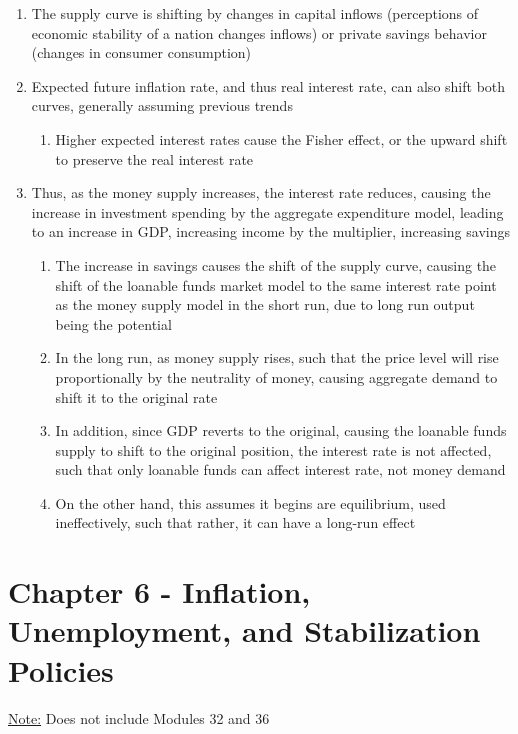 \documentclass[11 pt, twoside]{article}
\begin{document}
\begin{enumerate}
\item The supply curve is shifting by changes in capital inflows (perceptions of economic stability of a nation changes inflows) or private savings behavior (changes in consumer consumption)
\item Expected future inflation rate, and thus real interest rate, can also shift both curves, generally assuming previous trends
\begin{enumerate}
\item Higher expected interest rates cause the Fisher effect, or the upward shift to preserve the real interest rate
\end{enumerate}
\item Thus, as the money supply increases, the interest rate reduces, causing the increase in investment spending by the aggregate expenditure model, leading to an increase in GDP, increasing income by the multiplier, increasing savings
\begin{enumerate}
\item The increase in savings causes the shift of the supply curve, causing the shift of the loanable funds market model to the same interest rate point as the money supply model in the short run, due to long run output being the potential
\item In the long run, as money supply rises, such that the price level will rise proportionally by the neutrality of money, causing aggregate demand to shift it to the original rate
\item In addition, since GDP reverts to the original, causing the loanable funds supply to shift to the original position, the interest rate is not affected, such that only loanable funds can affect interest rate, not money demand
\item On the other hand, this assumes it begins are equilibrium, used ineffectively, such that rather, it can have a long-run effect
\end{enumerate}
\end{enumerate}

\section{Chapter 6 - Inflation, Unemployment, and Stabilization Policies}
\underline{Note:} Does not include Modules 32 and 36
\end{document}
